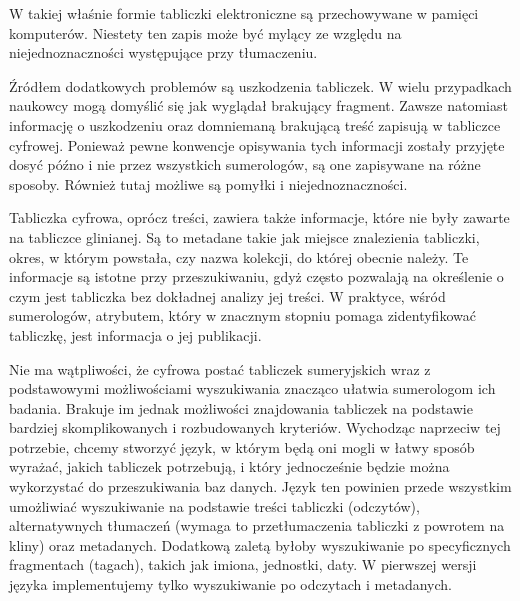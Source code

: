 W takiej właśnie formie tabliczki elektroniczne są przechowywane w pamięci komputerów. 
Niestety ten zapis może być mylący ze względu na niejednoznaczności występujące przy tłumaczeniu. 

Źródłem dodatkowych problemów są uszkodzenia tabliczek. 
W wielu przypadkach naukowcy mogą domyślić się jak wyglądał brakujący fragment. 
Zawsze natomiast informację o uszkodzeniu oraz domniemaną brakującą treść zapisują w tabliczce cyfrowej.
Ponieważ pewne konwencje opisywania tych informacji zostały przyjęte dosyć późno i nie przez wszystkich sumerologów, 
są one zapisywane na różne sposoby. Również tutaj możliwe są pomyłki i niejednoznaczności.

Tabliczka cyfrowa, oprócz treści, zawiera także informacje, które nie były zawarte na tabliczce glinianej. 
Są to metadane takie jak miejsce znalezienia tabliczki, okres, w którym powstała, czy nazwa kolekcji, do której obecnie należy. 
Te informacje są istotne przy przeszukiwaniu, gdyż często pozwalają na określenie o czym jest tabliczka bez dokładnej analizy 
jej treści. 
W praktyce, wśród sumerologów, atrybutem, który w znacznym stopniu pomaga zidentyfikować tabliczkę, jest informacja o jej publikacji.

Nie ma wątpliwości, że cyfrowa postać tabliczek sumeryjskich wraz z podstawowymi możliwościami wyszukiwania znacząco
ułatwia sumerologom ich badania. Brakuje im jednak możliwości znajdowania tabliczek na podstawie
bardziej skomplikowanych i rozbudowanych kryteriów.
Wychodząc naprzeciw tej potrzebie, chcemy stworzyć język, w którym będą oni mogli w łatwy sposób wyrażać, 
jakich tabliczek potrzebują, i który jednocześnie będzie można wykorzystać do przeszukiwania baz danych. 
Język ten powinien przede wszystkim umożliwiać wyszukiwanie na podstawie treści tabliczki (odczytów), 
alternatywnych tłumaczeń (wymaga to przetłumaczenia tabliczki z powrotem na kliny) oraz metadanych.
Dodatkową zaletą byłoby wyszukiwanie po specyficznych fragmentach (tagach), takich jak imiona, jednostki, daty.
W pierwszej wersji języka implementujemy tylko wyszukiwanie po odczytach i metadanych.